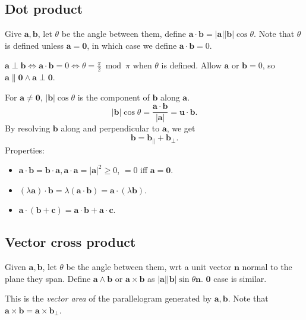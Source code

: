 \documentclass[a4paper]{article}
\begin{document}
\subsection{Dot product}
\begin{definition}
  Give $ \mathbf{a}, \mathbf{b} $, let $ \theta $ be the angle
  between them, define $
  \mathbf{a}\cdot\mathbf{b}=|\mathbf{a}||\mathbf{b}|\cos \theta $.
  Note that $ \theta $ is defined unless $ \mathbf{a}=\mathbf{0} $,
  in which case we define $ \mathbf{a}\cdot \mathbf{b}=0 $.

  $ \mathbf{a}\perp\mathbf{b} \Leftrightarrow \mathbf{a}\cdot
  \mathbf{b}=0 \Leftrightarrow \theta=\frac{\pi}{2}\bmod \pi $ when $
  \theta $ is defined. Allow $ \mathbf{a} $ or $ \mathbf{b}=0 $, so $
  \mathbf{a} \parallel \mathbf{0} \land \mathbf{a} \perp \mathbf{0} $.
\end{definition}
For $ \mathbf{a}\neq \mathbf{0} $, $ |\mathbf{b}|\cos \theta $ is the
component of $ \mathbf{b} $ along $ \mathbf{a} $.
\[
  \left| \mathbf{b} \right| \cos \theta = \frac{\mathbf{a}\cdot
  \mathbf{b}}{|\mathbf{a}|}=\mathbf{u}\cdot \mathbf{b}
.\]
By resolving $ \mathbf{b} $ along and perpendicular to $ \mathbf{a} $, we get
\[
  \mathbf{b} = \mathbf{b}_{\parallel} + \mathbf{b}_{\perp }
.\]
Properties:
\begin{itemize}
  \item $ \mathbf{a}\cdot \mathbf{b}=\mathbf{b}\cdot \mathbf{a},
    \mathbf{a}\cdot \mathbf{a}=|\mathbf{a}|^2\ge 0 $, $ =0 $ iff $
    \mathbf{a}=\mathbf{0} $.
  \item $ (\lambda \mathbf{a})\cdot \mathbf{b}=\lambda
    (\mathbf{a}\cdot \mathbf{b})=\mathbf{a}\cdot (\lambda \mathbf{b}) $.
  \item $ \mathbf{a}\cdot (\mathbf{b}+\mathbf{c})=\mathbf{a}\cdot
    \mathbf{b}+\mathbf{a}\cdot \mathbf{c} $.
\end{itemize}
\subsection{Vector cross product}
\begin{definition}
  Given $ \mathbf{a},\mathbf{b} $, let $ \theta $ be the angle
  between them, wrt a unit vector $ \mathbf{n} $ normal to the plane
  they span. Define $ \mathbf{a} \wedge \mathbf{b} $ or $ \mathbf{a}
  \times \mathbf{b} $ as $ |\mathbf{a}||\mathbf{b}|\sin \theta
  \mathbf{n} $. $ \mathbf{0} $ case is similar.
\end{definition}
This is the \textit{vector area} of the parallelogram generated by $
\mathbf{a}, \mathbf{b} $. Note that $ \mathbf{a} \times \mathbf{b} =
\mathbf{a} \times \mathbf{b}_{\perp } $.
\end{document}
